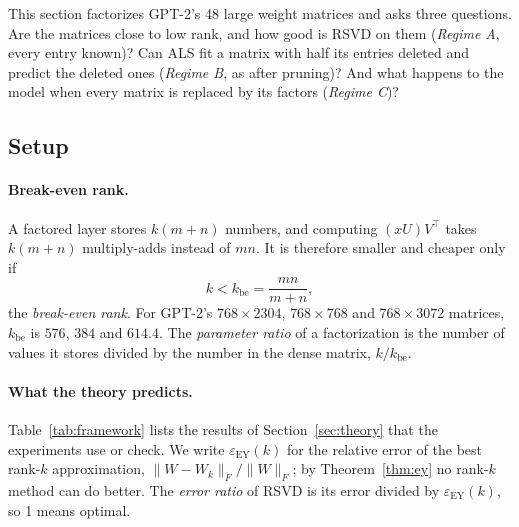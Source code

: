 \documentclass[10pt]{article}
\theoremstyle{plain}
\theoremstyle{definition}
\theoremstyle{remark}
\newcommand{\T}{^{\top}}
\newcommand{\fro}[1]{\lVert #1\rVert_F}
\newcommand{\kbe}{k_{\mathrm{be}}}
\newcommand{\epsEY}{\varepsilon_{\mathrm{EY}}}
\begin{document}
This section factorizes GPT-2's 48 large weight matrices and asks three questions. Are the matrices close to low rank, and how good is RSVD on them (\emph{Regime A}, every entry known)? Can ALS fit a matrix with half its entries deleted and predict the deleted ones (\emph{Regime B}, as after pruning)? And what happens to the model when every matrix is replaced by its factors (\emph{Regime C})?

\subsection{Setup}
\label{sec:wsetup}

\paragraph{Break-even rank.}
A factored layer stores $k(m+n)$ numbers, and computing $(xU)V\T$ takes $k(m+n)$ multiply-adds instead of $mn$. It is therefore smaller and cheaper only if
\[
k<\kbe=\frac{mn}{m+n},
\]
the \emph{break-even rank}. For GPT-2's $768\times2304$, $768\times768$ and $768\times3072$ matrices, $\kbe$ is $576$, $384$ and $614.4$. The \emph{parameter ratio} of a factorization is the number of values it stores divided by the number in the dense matrix, $k/\kbe$.

\paragraph{What the theory predicts.}
Table~\ref{tab:framework} lists the results of Section~\ref{sec:theory} that the experiments use or check. We write $\epsEY(k)$ for the relative error of the best rank-$k$ approximation, $\fro{W-W_k}/\fro W$; by Theorem~\ref{thm:ey} no rank-$k$ method can do better. The \emph{error ratio} of RSVD is its error divided by $\epsEY(k)$, so 1 means optimal.
\end{document}

